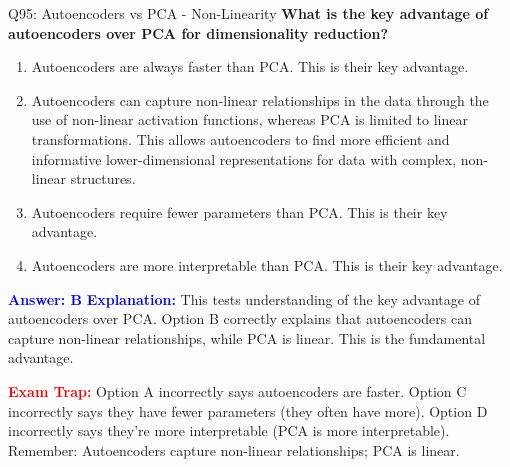\documentclass[8pt]{beamer}
\begin{document}
	\begin{frame}{Q95: Autoencoders vs PCA - Non-Linearity}
		\fontsize{6.5}{7.5}\selectfont
		\textbf{What is the key advantage of autoencoders over PCA for dimensionality reduction?}
		
		\begin{enumerate}
			\item Autoencoders are always faster than PCA. This is their key advantage.
			\item Autoencoders can capture non-linear relationships in the data through the use of non-linear activation functions, whereas PCA is limited to linear transformations. This allows autoencoders to find more efficient and informative lower-dimensional representations for data with complex, non-linear structures.
			\item Autoencoders require fewer parameters than PCA. This is their key advantage.
			\item Autoencoders are more interpretable than PCA. This is their key advantage.
		\end{enumerate}
		
		\vspace{0.1cm}
		\textcolor{blue}{\textbf{Answer: B}}
		\vspace{0.1cm}
		\textcolor{blue}{\textbf{Explanation:}} This tests understanding of the key advantage of autoencoders over PCA. Option B correctly explains that autoencoders can capture non-linear relationships, while PCA is linear. This is the fundamental advantage.
		
		\textcolor{red}{\textbf{Exam Trap:}} Option A incorrectly says autoencoders are faster. Option C incorrectly says they have fewer parameters (they often have more). Option D incorrectly says they're more interpretable (PCA is more interpretable). Remember: Autoencoders capture non-linear relationships; PCA is linear.
	\end{frame}
	
\end{document}
